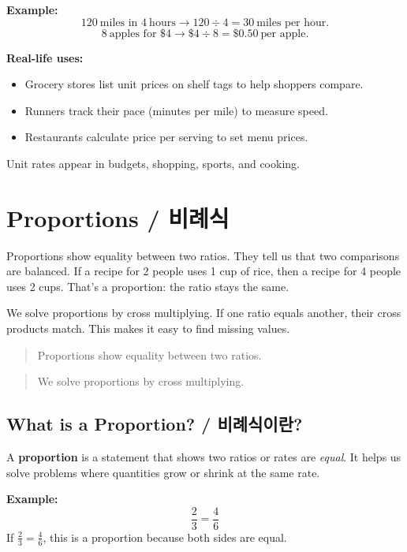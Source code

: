 \textbf{Example:}
\[
120\ \text{miles in }4\ \text{hours} \rightarrow 120\div 4 = 30\ \text{miles per hour}.
\]
\[
8\ \text{apples for }\$4 \rightarrow \$4\div 8 = \$0.50\ \text{per apple}.
\]

\textbf{Real-life uses:}
\begin{itemize}
  \item Grocery stores list unit prices on shelf tags to help shoppers compare.
  \item Runners track their pace (minutes per mile) to measure speed.
  \item Restaurants calculate price per serving to set menu prices.
\end{itemize}

Unit rates appear in budgets, shopping, sports, and cooking.



\newpage
\section{Proportions / 비례식}

Proportions show equality between two ratios. They tell us that two comparisons are
balanced. If a recipe for 2 people uses 1 cup of rice, then a recipe for 4 people
uses 2 cups. That's a proportion: the ratio stays the same.

We solve proportions by cross multiplying. If one ratio equals another, their cross
products match. This makes it easy to find missing values.

\blockquote{Proportions show equality between two ratios.}


\blockquote{We solve proportions by cross multiplying.}


\subsection{What is a Proportion? / 비례식이란?}

A \textbf{proportion} is a statement that shows two ratios or rates are \emph{equal}.
It helps us solve problems where quantities grow or shrink at the same rate.

\textbf{Example:}
\[
\frac{2}{3} = \frac{4}{6}
\]
If \(\frac{2}{3}=\frac{4}{6}\), this is a proportion because both sides are equal.

